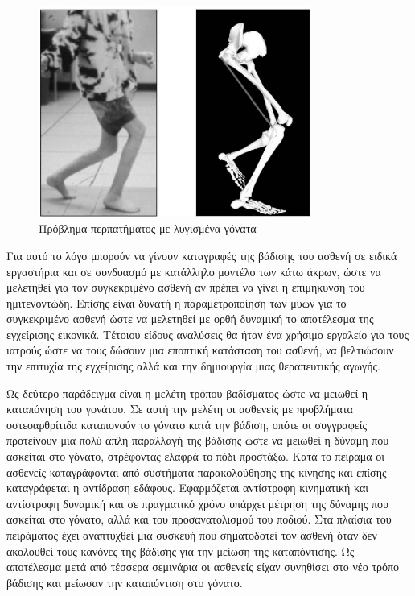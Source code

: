 \begin{figure}[H]
    \centering
    \includegraphics[width=0.8\textwidth, keepaspectratio]{fig/crouch-gait.png}
    \caption{Πρόβλημα περπατήματος με λυγισμένα γόνατα \cite{arnolda06}}
    \label{fig:crouch-gait}
\end{figure}

Για αυτό το λόγο μπορούν να γίνουν καταγραφές της βάδισης του ασθενή σε ειδικά εργαστήρια και σε συνδυασμό με κατάλληλο μοντέλο των κάτω άκρων, ώστε να μελετηθεί για τον συγκεκριμένο ασθενή αν πρέπει να γίνει η επιμήκυνση του ημιτενοντώδη. Επίσης είναι δυνατή η παραμετροποίηση των μυών για το συγκεκριμένο ασθενή ώστε να μελετηθεί με ορθή δυναμική το αποτέλεσμα της εγχείρισης εικονικά. Τέτοιου είδους αναλύσεις θα ήταν ένα χρήσιμο εργαλείο για τους ιατρούς ώστε να τους δώσουν μια εποπτική κατάσταση του ασθενή, να βελτιώσουν την επιτυχία της εγχείρισης αλλά και την δημιουργία μιας θεραπευτικής αγωγής.

Ως δεύτερο παράδειγμα \cite{fregly07} είναι η μελέτη τρόπου βαδίσματος ώστε να μειωθεί η καταπόνηση του γονάτου. Σε αυτή την μελέτη οι ασθενείς με προβλήματα οστεοαρθρίτιδα καταπονούν το γόνατο κατά την βάδιση, οπότε οι συγγραφείς προτείνουν μια πολύ απλή παραλλαγή της βάδισης ώστε να μειωθεί η δύναμη που ασκείται στο γόνατο, στρέφοντας ελαφρά το πόδι προστάξω. Κατά το πείραμα οι ασθενείς καταγράφονται από συστήματα παρακολούθησης της κίνησης και επίσης καταγράφεται η αντίδραση εδάφους. Εφαρμόζεται αντίστροφη κινηματική και αντίστροφη δυναμική και σε πραγματικό χρόνο υπάρχει μέτρηση της δύναμης που ασκείται στο γόνατο, αλλά και του προσανατολισμού του ποδιού. Στα πλαίσια του πειράματος έχει αναπτυχθεί μια συσκευή που σηματοδοτεί τον ασθενή όταν δεν ακολουθεί τους κανόνες της βάδισης για την μείωση της καταπόντισης. Ως αποτέλεσμα μετά από τέσσερα σεμινάρια οι ασθενείς είχαν συνηθίσει στο νέο τρόπο βάδισης και μείωσαν την καταπόντιση στο γόνατο.

